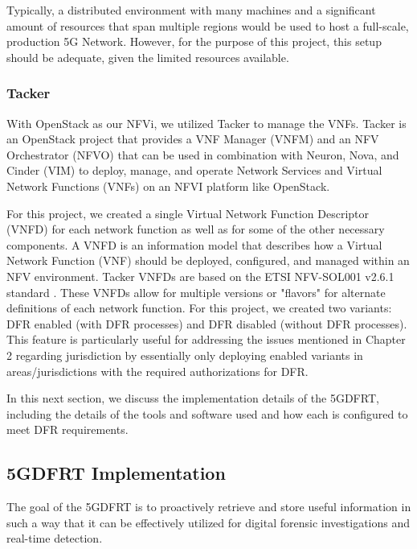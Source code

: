 \documentclass[final,1p,times,authoryear]{elsarticle}
\begin{document}
Typically, a distributed environment with many machines and a significant amount of resources that span multiple regions would be used to host a full-scale, production 5G Network. However, for the purpose of this project, this setup should be adequate, given the limited resources available.

\subsubsection{Tacker}
\label{sub3sub1sec2}
With OpenStack as our NFVi, we utilized Tacker to manage the VNFs. Tacker is an OpenStack project that provides a VNF Manager (VNFM) and an NFV Orchestrator (NFVO) that can be used in combination with Neuron, Nova, and Cinder (VIM) to deploy, manage, and operate Network Services and Virtual Network Functions (VNFs) on an NFVI platform like OpenStack.

\vspace{1em}

For this project, we created a single Virtual Network Function Descriptor (VNFD) for each network function as well as for some of the other necessary components. A VNFD is an information model that describes how a Virtual Network Function (VNF) should be deployed, configured, and managed within an NFV environment. Tacker VNFDs are based on the ETSI NFV-SOL001 v2.6.1 standard \citep{etsi2023}. These VNFDs allow for multiple versions or "flavors" for alternate definitions of each network function. For this project, we created two variants: DFR enabled (with DFR processes) and DFR disabled (without DFR processes). This feature is particularly useful for addressing the issues mentioned in Chapter 2 regarding jurisdiction by essentially only deploying enabled variants in areas/jurisdictions with the required authorizations for DFR.

\vspace{1em}

In this next section, we discuss the implementation details of the 5GDFRT, including the details of the tools and software used and how each is configured to meet DFR requirements.

\subsection{5GDFRT Implementation}
\label{sub3sec2}
The goal of the 5GDFRT is to proactively retrieve and store useful information in such a way that it can be effectively utilized for digital forensic investigations and real-time detection.
\end{document}
